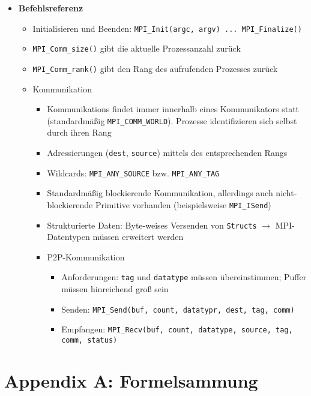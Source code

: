 \begin{itemize}
\begin{itemize}
\begin{itemize}
		\end{itemize}
	\end{itemize}
	\item \textbf{Befehlsreferenz}
	\begin{itemize}
		\item Initialisieren und Beenden: \texttt{MPI\_Init(argc, argv) ... MPI\_Finalize()}
		\item \texttt{MPI\_Comm\_size()} gibt die aktuelle Prozessanzahl zurück
		\item \texttt{MPI\_Comm\_rank()} gibt den Rang des aufrufenden Prozesses zurück
		\item Kommunikation
		\begin{itemize}
			\item Kommunikations findet immer innerhalb eines Kommunikators statt (standardmäßig \texttt{MPI\_COMM\_WORLD}). Prozesse identifizieren sich selbst durch ihren Rang
			\item Adressierungen (\texttt{dest}, \texttt{source}) mittels des entsprechenden Rangs
			\item Wildcards: \texttt{MPI\_ANY\_SOURCE} bzw. \texttt{MPI\_ANY\_TAG}
			\item Standardmäßig blockierende Kommunikation, allerdings auch nicht-blockierende Primitive vorhanden (beispielsweise \texttt{MPI\_ISend})
			\item Strukturierte Daten: Byte-weises Versenden von \texttt{Structs} \(\rightarrow\) MPI-Datentypen müssen erweitert werden
			\item P2P-Kommunikation
			\begin{itemize}
				\item Anforderungen: \texttt{tag} und \texttt{datatype} müssen übereinstimmen; Puffer müssen hinreichend groß sein
				\item Senden: \texttt{MPI\_Send(buf, count, datatypr, dest, tag, comm)}
				\item Empfangen: \texttt{MPI\_Recv(buf, count, datatype, source, tag, comm, status)}
			\end{itemize}
		\end{itemize}
	\end{itemize}
\end{itemize}



\newpage
\section{Appendix A: Formelsammung}

